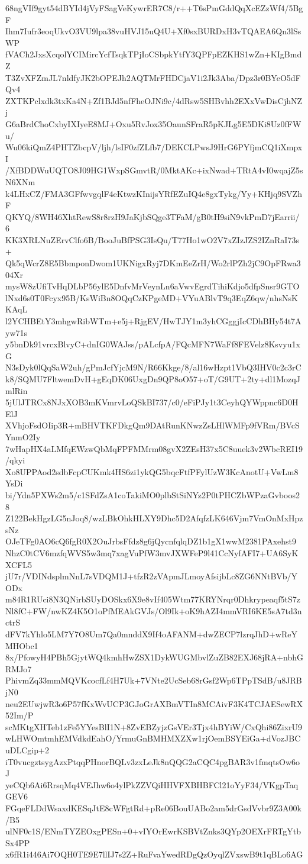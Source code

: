 68ngVIf9gyt54dBYId4jVyFSagVeKywrER7C8/r++T6sPmGddQqXcEZzWf4/5BgF
Ihm7Iufr3eoqUkvO3VU9lpa38vuHVJ15uQ4U+Xf0sxBURDxH3vTQAEA6Qn3lSsWP
fVACh2JxsXcqolYCIMircYcfTsqkTPjIoCSbpkYtfY3QPFpEZKHS1wZn+KIgBmdZ
T3ZvXFZmJL7nldfyJK2bOPEJh2AQTMrFHDCjaV1i2Jk3Aba/Dpz3r0BYeO5dFQv4
ZXTKPclxdk3txKa4N+Zf1BJd5nfFheOJNi9c/4dRsw5SHBvhh2EXxVwDisCjhNZj
G6aBrdChoCxbyIXIyeE8MJ+Oxu5RvJox35OaunSFraR5pKJLg5E5DKi8Uz0fFWu/
Wu06kiQmZ4PHTZbcpV/ljh/lsIF0zfZLfb7/DEKCLPwsJ9HrG6PYfjmCQ1iXmpxI
/XfBDDWuUQTO8J09HG1WxpSGmvtR/0MktAKc+ixNwad+TRtA4vI0wqajZ5sN6XNm
k4LHxCZ/FMA3GFfwvgqlF4eKtwzKInijsYRfEZuIQ4e8gxTykg/Yy+KHjq9SVZhF
QKYQ/8WH46XhtRewS8r8rzH9JaKjbSQge3TFaM/gB0tH9siN9vkPmD7jEarrii/6
KK3XRLNuZErvClfo6B/BooJuBfPSG3IsQu/T77Ho1wO2V7xZIzJZS2IZnRaI73s+
Qk5qWcrZ8E5BbmponDwom1UKNigxRyj7DKmEeZrH/Wo2rlPZh2jC9OpFRwa304Xr
mysW8zUfiTvHqDLbP56ylE5DnfvMrVeynLn6aVwvEgrdTihiKdjo5dfpSnsr9GTO
lNxd6s0T0Fcyx95B/KsWiBn8OQqCzKPgeMD+VYuABlvT9q3EqZ6qw/nhsNsKKAqL
l2YCHBEtY3mhgwRibWTm+e5j+RjgEV/HwTJY1m3yhCGggjIcCDhBHy54t7Ayw71s
y5bnDk91vrcxBlvyC+dnIG0WAJss/pALcfpA/FQcMFN7WaFf8FEVelz8Ksvyu1xG
N3sDyk0lQqSaW2uh/gPmJcfYjcM9N/R66Kkge/8/al16wHzpt1VbQ3IHV0c2c3rC
k8/SQMU7FltwemDvH+gEqDK06UxgDn9QP8oO57+oT/G9UT+2ty+dl1MozqJmlRin
5jUlJTRCx8NJxXOB3mKVmrvLoQSkBI737/c0/eFiPJy1t3CeyhQYWppnc6D0HElJ
XVhjoFsdOIip3R+mBHVTKFDkgQm9DAtRunKNwzZsLHlWMFp9fVRm/BVcSYnmO2Iy
7wHapHX4aLMfqEWzwQbMqFPFMMrm08gvX2ZEsH37x5C8uuek3v2WbcREI19/qkyi
Xo8UPPAod2sdbFcpCUKmk4HS6zi1ykQG5bqcFtfPFylUzW3KcAnotU+VwLm8YsDi
bi/Ydn5PXWs2m5/c1SFdZsA1coTakiMO0plbStSiNYz2P0tPHCZbWPzaGvboos28
Z122BekHgzLG5nJoq8/wzLBkOhkHLXY9Dhc5D2AfqfzLK646Vjm7VmOnMxHpzsNz
OJeTFg0AO6cQ6fgR0X2OuJrbsFfdz8g6jQycnfqlqDZ1b1gX1wwM2381PAxehst9
NhzC0tCV6mzfqWVS5w3mq7xagVuPfW3mvJXWFeP9l41CcNyfAFI7+UA6SyKXCFL5
jU7r/VDINdsplmNnL7sVDQM1J+tfzR2zVApmJLmoyAfsijbLc8ZG6NNtBVb/YODx
m84R1RUci8N3QNirbSUyDOSkx6X9e8vIf405Wtm77KRYNrqr0Dhkrypeaqf5tS7z
Nl8fC+FW/nwKZ4K5O1oPfMEAkGVJs/Ol9Ik+oK9hAZI4mmVRI6KE5sA7td3nctrS
dFV7kYhlo5LM7Y7O8Um7Qa0mnddX9If4oAFANM+dwZECP7lzrqJhD+wReYMHObc1
8x/PfowyH4PBh5GjytWQ4kmhHwZSX1DykWUGMbvlZuZB82EXJ68jRA+nbhGRMJo7
PhivmZq33mmMQVKcocfLf4H7Uk+7VNte2UcSeb68rGsf2Wp6TPpTSdB/u8JRBjN0
neu2EUwjwR3o6P57fKxWvUCP3GJoGrAXBmVTIn8MCAivF3K4TCJAESewRX52Im/P
scMKtgXHTeb1zFe5YYesBlI1N+8ZvEBZyjzGsVEr3Tjx4hBYiW/CxQhi86ZixrU9
wLHWOmtmhEMVdkdEahO/YrmuGnBMHMXZXw1rjOemBSYEiGa+dVozJBCuDLCgip+2
iT0vucgztsygAzxPtqqPHnorBQLv3zxLeJk8nQQG2aCQC4pgBAR3v1fmqtsOw6oJ
yeCQb6Ai6RrsqMq4VEJhw6o4ylPkZZVQiHHVFXBHBFCl21oYyF34/VKgpTaqGEV6
FGqeFLDdWsaxdKESqJtE8cWFgtRd+pRe06BouUABo2am5drGsdVvbr9Z3A00k/B5
ulNF0c1S/ENmTYZEOxgPESn+0+vIYOrEwrKSBVtZnks3QYp2OEXrFRTgYtbSx4PP
x6fR1i446Ai7OQH0TE9E7llIJ7s2Z+RuFvaYwedRDgQzOyqlZVxswB9t1qBLo6AG
